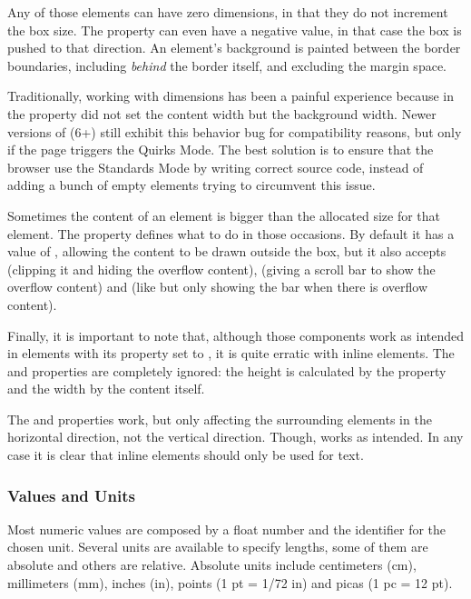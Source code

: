 Any of those elements can have zero dimensions, in that they do not increment the box size.
The  property can even have a negative value, in that case the box is pushed to that direction.
An element's background is painted between the border boundaries, including \emph{behind} the border itself, and excluding the margin space.

Traditionally, working with  dimensions has been a painful experience because in  the  property did not set the content width but the background width.
Newer versions of  (6+) still exhibit this behavior bug for compatibility reasons, but only if the page triggers the Quirks Mode.
The best solution is to ensure that the browser use the Standards Mode by writing correct  source code, instead of adding a bunch of empty elements trying to circumvent this issue.

Sometimes the content of an element is bigger than the allocated size for that element.
The  property defines what to do in those occasions.
By default it has a value of , allowing the content to be drawn outside the box, but it also accepts  (clipping it and hiding the overflow content),  (giving a scroll bar to show the overflow content) and  (like  but only showing the bar when there is overflow content).

Finally, it is important to note that, although those components work as intended in elements with its  property set to , it is quite erratic with inline elements.
The  and  properties are completely ignored: the height is calculated by the  property and the width by the content itself.

The  and  properties work, but only affecting the surrounding elements in the horizontal direction, not the vertical direction.
Though,  works as intended.
In any case it is clear that inline elements should only be used for text.


\subsubsection{Values and Units} %
\label{ssub:valuesunits}

Most numeric values are composed by a float number and the identifier for the chosen unit.
Several units are available to specify lengths, some of them are absolute and others are relative.
Absolute units include centimeters (cm), millimeters (mm), inches (in), points (1 pt = 1/72 in) and picas (1 pc = 12 pt).

